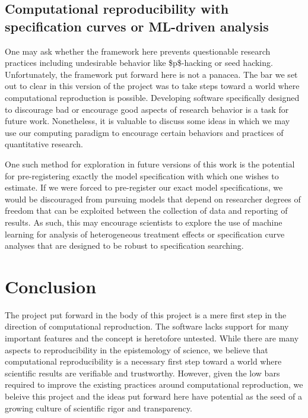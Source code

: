 \hypertarget{computational-reproducibility-with-specification-curves-or-ml-driven-analysis}{%
\subsection{Computational reproducibility with specification curves or ML-driven analysis}\label{computational-reproducibility-with-specification-curves-or-ml-driven-analysis}}

One may ask whether the framework here prevents questionable research practices including undesirable behavior like \$p\$-hacking or seed hacking. Unfortunately, the framework put forward here is not a panacea. The bar we set out to clear in this version of the project was to take steps toward a world where computational reproduction is possible. Developing software specifically designed to discourage bad or encourage good aspects of research behavior is a task for future work. Nonetheless, it is valuable to discuss some ideas in which we may use our computing paradigm to encourage certain behaviors and practices of quantitative research.

One such method for exploration in future versions of this work is the potential for pre-registering exactly the model specification with which one wishes to estimate. If we were forced to pre-register our exact model specifications, we would be discouraged from pursuing models that depend on researcher degrees of freedom that can be exploited between the collection of data and reporting of results. As such, this may encourage scientists to explore the use of machine learning for analysis of heterogeneous treatment effects or specification curve analyses that are designed to be robust to specification searching. 

\hypertarget{conclusion}{%
\section{Conclusion}\label{conclusion}}

The project put forward in the body of this project is a mere first step in the direction of computational reproduction. The software lacks support for many important features and the concept is heretofore untested. While there are many aspects to reproducibility in the epistemology of science, we believe that computational reproducibility is a necessary first step toward a world where scientific results are verifiable and trustworthy. However, given the low bars required to improve the existing practices around computational reproduction, we beleive this project and the ideas put forward here have potential as the seed of a growing culture of scientific rigor and transparency. 

